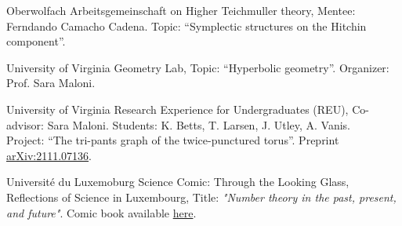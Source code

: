 {Oberwolfach}
{Arbeitsgemeinschaft on Higher Teichmuller theory,}
{Mentee: Ferndando Camacho Cadena. Topic: ``Symplectic structures on the Hitchin component''.}

{University of Virginia}
{Geometry Lab,}
{Topic: ``Hyperbolic geometry''. Organizer: Prof. Sara Maloni.}

{University of Virginia}
{Research Experience for Undergraduates (REU),}
{Co-advisor: Sara Maloni. Students: K. Betts, T. Larsen, J. Utley, A. Vanis. \\Project: ``The tri-pants graph of the twice-punctured torus''. Preprint \href{https://arxiv.org/abs/2111.07136}{arXiv:2111.07136}.}

{Universit{\'e} du Luxemoburg}
{Science Comic: Through the Looking Glass, \\Reflections of Science in Luxembourg,}
{Title: \emph{"Number theory in the past, present, and future"}. Comic book available \href{https://www.yumpu.com/en/document/view/62710549/science-comic-through-the-looking-glass-reflections-of-science-in-luxembourg}{here}.}
